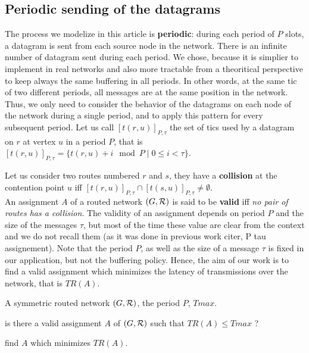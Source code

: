 \documentclass[english]{article}
\begin{document}
     
  \subsection{Periodic sending of the datagrams}

 	The process we modelize in this article is \textbf{periodic}: during each period of $P$ slots, a datagram is sent from each source node in the network. There is an infinite number of datagram sent during each period. We chose, because it is simplier to implement in real networks and 
 	also more tractable from a theoritical perspective to keep always the same buffering in all periods. In other words, at the same tic of two different periods, all messages are at the same position in the network. Thus, we only need to consider the behavior of the datagrams on each node of the network during a single period, and to apply this pattern for every subsequent period. 
    Let us call $[t(r,u)]_{P,\tau}$ the set of tics used by a datagram on $r$ at vertex $u$ in a period $P$, that is $[t(r,u)]_{P,\tau} = \{t(r,u) + i \mod P \mid 0 \leq i < \tau \}$. 

      Let us consider two routes numbered $r$ and $s$, they have a {\bf collision} at the contention point $u$ iff $[t(r,u)]_{P,\tau} \cap [t(s,u)]_{P,\tau} \neq \emptyset$.\\

        An assignment $A$ of a routed network $(G,{\cal R})$ is said to be \textbf{valid} iff \emph{no pair of routes has a collision}. 
        The validity of an assignment depends on period $P$ and the size of the messages $\tau$, but most of the time these value are clear from the context and we do not recall them (as it was done in previous work citer, P tau assignement).
        Note that the period $P$, as well as the size of a message $\tau$ is fixed in our application, but not the buffering policy. Hence, the aim of our work is to find a valid assignment which minimizes the latency of transmissions over the network, that is $TR(A)$.
        
       

        A symmetric routed network $(G,{\cal R})$, the period $P$, $Tmax$.
      
       is there a valid assignment $A$ of $(G,{\cal R})$ such that $ TR(A) \leq Tmax$ ?

       find $A$ which minimizes $TR(A)$.
    
\end{document}
